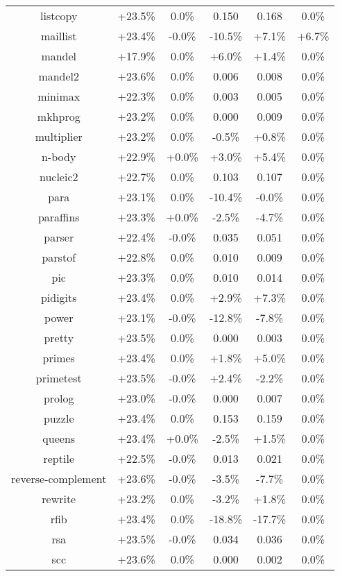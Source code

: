 \begin{tabular}{ c c c c c c }
listcopy & +23.5\% &  0.0\% & 0.150 & 0.168 &  0.0\%\\
maillist & +23.4\% & -0.0\% & -10.5\% & +7.1\% & +6.7\%\\
mandel & +17.9\% &  0.0\% & +6.0\% & +1.4\% &  0.0\%\\
mandel2 & +23.6\% &  0.0\% & 0.006 & 0.008 &  0.0\%\\
minimax & +22.3\% &  0.0\% & 0.003 & 0.005 &  0.0\%\\
mkhprog & +23.2\% &  0.0\% & 0.000 & 0.009 &  0.0\%\\
multiplier & +23.2\% &  0.0\% & -0.5\% & +0.8\% &  0.0\%\\
n-body & +22.9\% & +0.0\% & +3.0\% & +5.4\% &  0.0\%\\
nucleic2 & +22.7\% &  0.0\% & 0.103 & 0.107 &  0.0\%\\
para & +23.1\% &  0.0\% & -10.4\% & -0.0\% &  0.0\%\\
paraffins & +23.3\% & +0.0\% & -2.5\% & -4.7\% &  0.0\%\\
parser & +22.4\% & -0.0\% & 0.035 & 0.051 &  0.0\%\\
parstof & +22.8\% &  0.0\% & 0.010 & 0.009 &  0.0\%\\
pic & +23.3\% &  0.0\% & 0.010 & 0.014 &  0.0\%\\
pidigits & +23.4\% &  0.0\% & +2.9\% & +7.3\% &  0.0\%\\
power & +23.1\% & -0.0\% & -12.8\% & -7.8\% &  0.0\%\\
pretty & +23.5\% &  0.0\% & 0.000 & 0.003 &  0.0\%\\
primes & +23.4\% &  0.0\% & +1.8\% & +5.0\% &  0.0\%\\
primetest & +23.5\% & -0.0\% & +2.4\% & -2.2\% &  0.0\%\\
prolog & +23.0\% & -0.0\% & 0.000 & 0.007 &  0.0\%\\
puzzle & +23.4\% &  0.0\% & 0.153 & 0.159 &  0.0\%\\
queens & +23.4\% & +0.0\% & -2.5\% & +1.5\% &  0.0\%\\
reptile & +22.5\% & -0.0\% & 0.013 & 0.021 &  0.0\%\\
reverse-complement & +23.6\% & -0.0\% & -3.5\% & -7.7\% &  0.0\%\\
rewrite & +23.2\% &  0.0\% & -3.2\% & +1.8\% &  0.0\%\\
rfib & +23.4\% &  0.0\% & -18.8\% & -17.7\% &  0.0\%\\
rsa & +23.5\% & -0.0\% & 0.034 & 0.036 &  0.0\%\\
scc & +23.6\% &  0.0\% & 0.000 & 0.002 &  0.0\%\\

\end{tabular}
